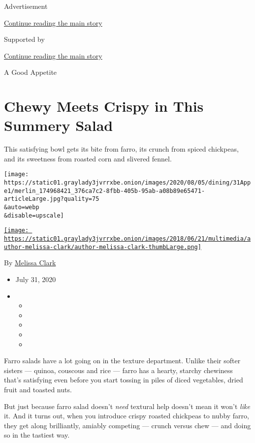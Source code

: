 Advertisement

\protect\hyperlink{after-top}{Continue reading the main story}

Supported by

\protect\hyperlink{after-sponsor}{Continue reading the main story}

A Good Appetite

\hypertarget{chewy-meets-crispy-in-this-summery-salad}{%
\section{Chewy Meets Crispy in This Summery
Salad}\label{chewy-meets-crispy-in-this-summery-salad}}

This satisfying bowl gets its bite from farro, its crunch from spiced
chickpeas, and its sweetness from roasted corn and slivered fennel.

\texttt{[image: https://static01.graylady3jvrrxbe.onion/images/2020/08/05/dining/31Appe1/merlin\_174968421\_376ca7c2-8fbb-405b-95ab-a08b89e65471-articleLarge.jpg?quality=75\\\&auto=webp\\\&disable=upscale]}

\href{https://www.nytimes3xbfgragh.onion/by/melissa-clark}{\texttt{[image: https://static01.graylady3jvrrxbe.onion/images/2018/06/21/multimedia/author-melissa-clark/author-melissa-clark-thumbLarge.png]}}

By \href{https://www.nytimes3xbfgragh.onion/by/melissa-clark}{Melissa
Clark}

\begin{itemize}
\item
  July 31, 2020
\item
  \begin{itemize}
  \item
  \item
  \item
  \item
  \item
  \end{itemize}
\end{itemize}

Farro salads have a lot going on in the texture department. Unlike their
softer sisters --- quinoa, couscous and rice --- farro has a hearty,
starchy chewiness that's satisfying even before you start tossing in
piles of diced vegetables, dried fruit and toasted nuts.

But just because farro salad doesn't \emph{need} textural help doesn't
mean it won't \emph{like} it. And it turns out, when you introduce
crispy roasted chickpeas to nubby farro, they get along brilliantly,
amiably competing --- crunch versus chew --- and doing so in the
tastiest way.

